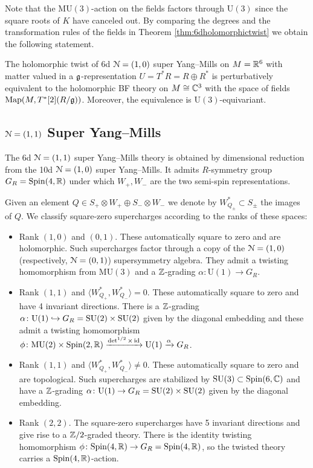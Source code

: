 \documentclass[10pt, oneside]{article}
\newcommand{\MU}{\mathrm{MU}}
\renewcommand{\U}{\mathrm{U}}
\begin{document}
Note that the $\MU(3)$-action on the fields factors through $\U(3)$ since the square roots of $K$ have canceled out. By comparing the degrees and the transformation rules of the fields in Theorem \ref{thm:6dholomorphictwist} we obtain the following statement.

\begin{thm}
The holomorphic twist of 6d $\mathcal N=(1, 0)$ super Yang--Mills on $M=\mathbb R^6$ with matter valued in a $\mathfrak g$-representation $U=T^*R=R\oplus R^*$ is perturbatively equivalent to the holomorphic BF theory on $M\cong \mathbb C^3$ with the space of fields $\operatorname{Map}(M, T^*[2] (R/\mathfrak g))$. Moreover, the equivalence is $\U(3)$-equivariant.
\label{thm:6dholomorphictwistgraded}
\end{thm}

\subsection{\texorpdfstring{$\mathcal N=(1, 1)$}{N=(1, 1)} Super Yang--Mills}

The 6d $\mathcal N=(1, 1)$ super Yang--Mills theory is obtained by dimensional reduction from the 10d $\mathcal N=(1, 0)$ super Yang--Mills. It admits $R$-symmetry group $G_R=\mathrm{Spin}(4, \mathbb R)$ under which $W_+, W_-$ are the two semi-spin representations.

Given an element $Q\in S_+\otimes W_+\oplus S_-\otimes W_-$ we denote by $W^*_{Q_\pm}\subset S_\pm$ the images of $Q$. We classify square-zero supercharges according to the ranks of these spaces:
\begin{itemize}
\item Rank $(1, 0)$ and $(0, 1)$. These automatically square to zero and are holomorphic.  Such supercharges factor through a copy of the $\mathcal{N}=(1,0)$ (respectively, $\mathcal N=(0, 1)$) supersymmetry algebra. They admit a twisting homomorphism from $\MU(3)$ and a $\mathbb Z$-grading $\alpha\colon \U(1)\rightarrow G_R$.

\item Rank $(1, 1)$ and $\langle W^*_{Q_+}, W^*_{Q_-}\rangle = 0$. These automatically square to zero and have 4 invariant directions. There is a $\mathbb Z$-grading $\alpha\colon \U(1)\hookrightarrow G_R=\SU(2)\times \SU(2)$ given by the diagonal embedding and these admit a twisting homomorphism $\phi\colon \MU(2)\times \Spin(2, \RR)\xrightarrow{\det^{1/2}\times \id}\U(1)\xrightarrow{\alpha} G_R$.

\item Rank $(1, 1)$ and $\langle W^*_{Q_+}, W^*_{Q_-}\rangle \neq 0$. These automatically square to zero and are topological. Such supercharges are stabilized by $\mathrm{SU}(3)\subset \mathrm{Spin}(6, \mathbb C)$ and have a $\mathbb Z$-grading $\alpha\colon \U(1)\rightarrow G_R=\SU(2)\times \SU(2)$ given by the diagonal embedding.

\item Rank $(2, 2)$. The square-zero supercharges have 5 invariant directions and give rise to a $\mathbb Z/2$-graded theory. There is the identity twisting homomorphism $\phi\colon \mathrm{Spin}(4, \mathbb R)\rightarrow G_R=\mathrm{Spin}(4, \mathbb R)$, so the twisted theory carries a $\mathrm{Spin}(4, \mathbb R)$-action.
\end{itemize}
\end{document}
